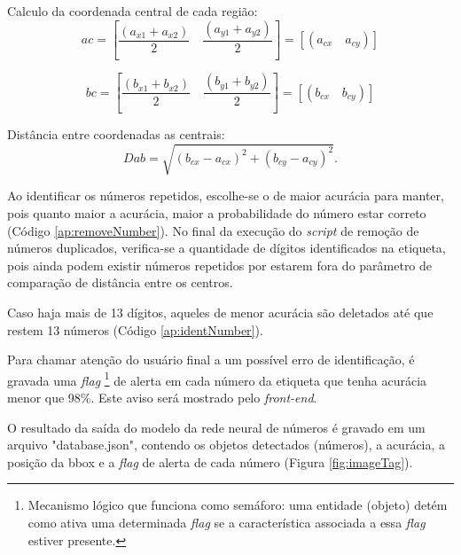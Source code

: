 Calculo da coordenada central de cada região:
\begin{equation} 
ac = \left[\frac{(a_{x1} + a_{x2})}{2} \quad  \frac{(a_{y1} + a_{y2})}{2}\right] = [(a_{cx}\quad  a_{cy})]
\label{eq: central_a}
\end{equation}

\begin{equation} 
bc = \left[\frac{(b_{x1} + b_{x2})}{2} \quad  \frac{(b_{y1} + b_{y2})}{2}\right] = [(b_{cx}\quad  b_{cy})]
\label{eq: central_b}
\end{equation}


Distância entre coordenadas as centrais:
\begin{equation} 
Dab = \sqrt{(b_{cx} - a_{cx})^2 + (b_{cy} - a_{cy})^2}.
\label{eq: euclid}
\end{equation}

Ao identificar os números repetidos, escolhe-se o de maior acurácia para manter, pois quanto maior a acurácia, maior a probabilidade do número estar correto (Código \ref{ap:removeNumber}).
%
No final da execução do \textit{script} de remoção de números duplicados, verifica-se a quantidade de dígitos identificados na etiqueta, pois ainda podem existir números repetidos por estarem fora do parâmetro de comparação de distância entre os centros.

Caso haja mais de 13 dígitos, aqueles de menor acurácia são deletados até que restem 13 números (Código \ref{ap:identNumber}).

Para chamar atenção do usuário final a um possível erro de identificação, é gravada uma \textit{flag}
%
\footnote{Mecanismo lógico que funciona como semáforo: uma entidade (objeto) detém como ativa uma determinada \textit{flag} se a característica associada a essa \textit{flag} estiver presente.} 
%
de alerta em cada número da etiqueta que tenha acurácia menor que 98\%. Este aviso será mostrado pelo \textit{front-end}. 

O resultado da saída do modelo da rede neural de números é gravado em um arquivo "database.json", contendo os objetos detectados (números), a acurácia, a posição da bbox e a \textit{flag} de alerta de cada número (Figura \ref{fig:imageTag}).

